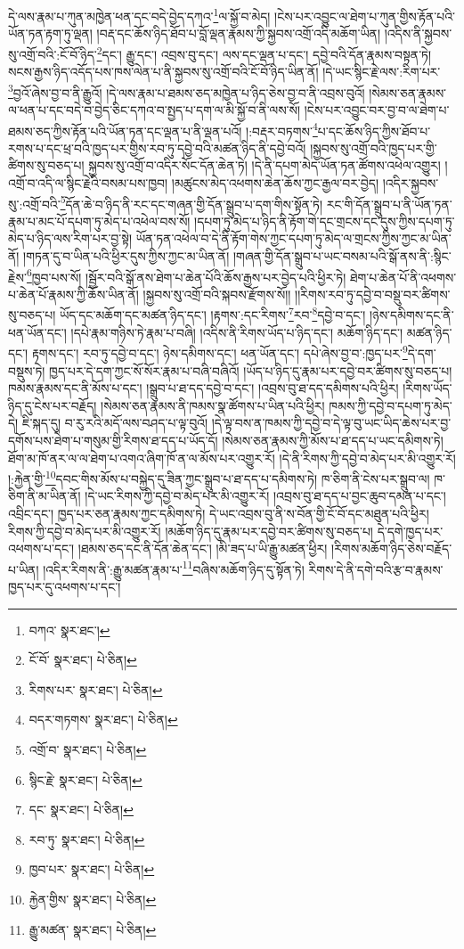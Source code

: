 དེ་ལས་རྣམ་པ་ཀུན་མཁྱེན་ཕན་དང་བདེ་བྱེད་དཀའ་\footnote{བཀའ་  སྣར་ཐང་། }ལ་སྐྱོ་བ་མེད། །ངེས་པར་འབྱུང་ལ་ཐེག་པ་ཀུན་གྱིས་རྟོན་པའི་ཡོན་ཏན་རྟག་ཏུ་ལྡན། །བརྡ་དང་ཆོས་ཉིད་ཐོབ་པ་བློ་ལྡན་རྣམས་ཀྱི་སྐྱབས་འགྲོ་འདི་མཆོག་ཡིན། །འདིས་ནི་སྐྱབས་སུ་འགྲོ་བའི་:ངོ་བོ་ཉིད་\footnote{ངོ་བོ་  སྣར་ཐང་།  པེ་ཅིན། }དང་། རྒྱུ་དང་། འབྲས་བུ་དང་། ལས་དང་ལྡན་པ་དང་། དབྱེ་བའི་དོན་རྣམས་བསྟན་ཏེ། སངས་རྒྱས་ཉིད་འདོད་པས་ཁས་ལེན་པ་ནི་སྐྱབས་སུ་འགྲོ་བའི་ངོ་བོ་ཉིད་ཡིན་ནོ། །དེ་ཡང་སྙིང་རྗེ་ལས་:རིག་པར་\footnote{རིགས་པར་  སྣར་ཐང་།  པེ་ཅིན། }བྱའོ་ཞེས་བྱ་བ་ནི་རྒྱུའོ། །དེ་ལས་རྣམ་པ་ཐམས་ཅད་མཁྱེན་པ་ཉིད་ཅེས་བྱ་བ་ནི་འབྲས་བུའོ། །སེམས་ཅན་རྣམས་ལ་ཕན་པ་དང་བདེ་བ་བྱེད་ཅིང་དཀའ་བ་སྤྱད་པ་དག་ལ་མི་སྐྱོ་བ་ནི་ལས་སོ། །ངེས་པར་འབྱུང་བར་བྱ་བ་ལ་ཐེག་པ་ཐམས་ཅད་ཀྱིས་རྟོན་པའི་ཡོན་ཏན་དང་ལྡན་པ་ནི་ལྡན་པའོ། །:བརྡར་བཏགས་\footnote{བདར་གཏགས་  སྣར་ཐང་།  པེ་ཅིན། }པ་དང་ཆོས་ཉིད་ཀྱིས་ཐོབ་པ་རགས་པ་དང་ཕྲ་བའི་ཁྱད་པར་གྱིས་རབ་ཏུ་དབྱེ་བའི་མཚན་ཉིད་ནི་དབྱེ་བའོ། །སྐྱབས་སུ་འགྲོ་བའི་ཁྱད་པར་གྱི་ཚིགས་སུ་བཅད་པ། སྐྱབས་སུ་འགྲོ་བ་འདིར་སོང་དོན་ཆེན་ཏེ། །དེ་ནི་དཔག་མེད་ཡོན་ཏན་ཚོགས་འཕེལ་འགྱུར། །འགྲོ་བ་འདི་ལ་སྙིང་རྗེའི་བསམ་པས་ཁྱབ། །མཚུངས་མེད་འཕགས་ཆེན་ཆོས་ཀྱང་རྒྱལ་བར་བྱེད། །འདིར་སྐྱབས་སུ་:འགྲོ་བའི་\footnote{འགྲོ་བ་  སྣར་ཐང་།  པེ་ཅིན། }དོན་ཆེ་བ་ཉིད་ནི་རང་དང་གཞན་གྱི་དོན་སྒྲུབ་པ་དག་གིས་སྟོན་ཏེ། རང་གི་དོན་སྒྲུབ་པ་ནི་ཡོན་ཏན་རྣམ་པ་མང་པོ་དཔག་ཏུ་མེད་པ་འཕེལ་བས་སོ། །དཔག་ཏུ་མེད་པ་ཉིད་ནི་རྟོག་གེ་དང་གྲངས་དང་དུས་ཀྱིས་དཔག་ཏུ་མེད་པ་ཉིད་ལས་རིག་པར་བྱ་སྟེ། ཡོན་ཏན་འཕེལ་བ་དེ་ནི་རྟོག་གེས་ཀྱང་དཔག་ཏུ་མེད་ལ་གྲངས་ཀྱིས་ཀྱང་མ་ཡིན་ནོ། །གཏན་དུ་བ་ཡིན་པའི་ཕྱིར་དུས་ཀྱིས་ཀྱང་མ་ཡིན་ནོ། །གཞན་གྱི་དོན་སྒྲུབ་པ་ཡང་བསམ་པའི་སྒོ་ནས་ནི་:སྙིང་རྗེས་\footnote{སྙིང་རྗེ་  སྣར་ཐང་།  པེ་ཅིན། }ཁྱབ་པས་སོ། །སྦྱོར་བའི་སྒོ་ནས་ཐེག་པ་ཆེན་པོའི་ཆོས་རྒྱས་པར་བྱེད་པའི་ཕྱིར་ཏེ། ཐེག་པ་ཆེན་པོ་ནི་འཕགས་པ་ཆེན་པོ་རྣམས་ཀྱི་ཆོས་ཡིན་ནོ། །སྐྱབས་སུ་འགྲོ་བའི་སྐབས་རྫོགས་སོ།། །།རིགས་རབ་ཏུ་དབྱེ་བ་བསྡུ་བར་ཚིགས་སུ་བཅད་པ། ཡོད་དང་མཆོག་དང་མཚན་ཉིད་དང་། །རྟགས་:དང་རིགས་\footnote{དང་  སྣར་ཐང་།  པེ་ཅིན། }རབ་\footnote{རབ་ཏུ་  སྣར་ཐང་།  པེ་ཅིན། }དབྱེ་བ་དང་། །ཉེས་དམིགས་དང་ནི་ཕན་ཡོན་དང་། །དཔེ་རྣམ་གཉིས་ཏེ་རྣམ་པ་བཞི། །འདིས་ནི་རིགས་ཡོད་པ་ཉིད་དང་། མཆོག་ཉིད་དང་། མཚན་ཉིད་དང་། རྟགས་དང་། རབ་ཏུ་དབྱེ་བ་དང་། ཉེས་དམིགས་དང་། ཕན་ཡོན་དང་། དཔེ་ཞེས་བྱ་བ་:ཁྱད་པར་\footnote{ཁྱབ་པར་  སྣར་ཐང་།  པེ་ཅིན། }དེ་དག་བསྡུས་ཏེ། ཁྱད་པར་དེ་དག་ཀྱང་སོ་སོར་རྣམ་པ་བཞི་བཞིའོ། །ཡོད་པ་ཉིད་དུ་རྣམ་པར་དབྱེ་བར་ཚིགས་སུ་བཅད་པ། ཁམས་རྣམས་དང་ནི་མོས་པ་དང་། །སྒྲུབ་པ་ཐ་དད་དབྱེ་བ་དང་། །འབྲས་བུ་ཐ་དད་དམིགས་པའི་ཕྱིར། །རིགས་ཡོད་ཉིད་དུ་ངེས་པར་བརྗོད། །སེམས་ཅན་རྣམས་ནི་ཁམས་སྣ་ཚོགས་པ་ཡིན་པའི་ཕྱིར། ཁམས་ཀྱི་དབྱེ་བ་དཔག་ཏུ་མེད་དེ། ཇི་སྐད་དུ། བ་རུ་རའི་མདོ་ལས་བཤད་པ་ལྟ་བུའོ། །དེ་ལྟ་བས་ན་ཁམས་ཀྱི་དབྱེ་བ་དེ་ལྟ་བུ་ཡང་ཡིད་ཆེས་པར་བྱ་དགོས་པས་ཐེག་པ་གསུམ་གྱི་རིགས་ཐ་དད་པ་ཡོད་དོ། །སེམས་ཅན་རྣམས་ཀྱི་མོས་པ་ཐ་དད་པ་ཡང་དམིགས་ཏེ། ཐོག་མ་ཁོ་ནར་ལ་ལ་ཐེག་པ་འགའ་ཞིག་ཁོ་ན་ལ་མོས་པར་འགྱུར་རོ། །དེ་ནི་རིགས་ཀྱི་དབྱེ་བ་མེད་པར་མི་འགྱུར་རོ། །:རྐྱེན་གྱི་\footnote{རྐྱེན་གྱིས་  སྣར་ཐང་།  པེ་ཅིན། }དབང་གིས་མོས་པ་བསྐྱེད་དུ་ཟིན་ཀྱང་སྒྲུབ་པ་ཐ་དད་པ་དམིགས་ཏེ། ཁ་ཅིག་ནི་ངེས་པར་སྒྲུབ་ལ། ཁ་ཅིག་ནི་མ་ཡིན་ནོ། །དེ་ཡང་རིགས་ཀྱི་དབྱེ་བ་མེད་པར་མི་འགྱུར་རོ། །འབྲས་བུ་ཐ་དད་པ་བྱང་ཆུབ་དམན་པ་དང་། འབྲིང་དང་། ཁྱད་པར་ཅན་རྣམས་ཀྱང་དམིགས་ཏེ། དེ་ཡང་འབྲས་བུ་ནི་ས་བོན་གྱི་ངོ་བོ་དང་མཐུན་པའི་ཕྱིར། རིགས་ཀྱི་དབྱེ་བ་མེད་པར་མི་འགྱུར་རོ། །མཆོག་ཉིད་དུ་རྣམ་པར་དབྱེ་བར་ཚིགས་སུ་བཅད་པ། དེ་དགེ་ཁྱད་པར་འཕགས་པ་དང་། །ཐམས་ཅད་དང་ནི་དོན་ཆེན་དང་། །མི་ཟད་པ་ཡི་རྒྱུ་མཚན་ཕྱིར། །རིགས་མཆོག་ཉིད་ཅེས་བརྗོད་པ་ཡིན། །འདིར་རིགས་ནི་:རྒྱུ་མཚན་རྣམ་པ་\footnote{རྒྱུ་མཚན་  སྣར་ཐང་།  པེ་ཅིན། }བཞིས་མཆོག་ཉིད་དུ་སྟོན་ཏེ། རིགས་དེ་ནི་དགེ་བའི་རྩ་བ་རྣམས་ཁྱད་པར་དུ་འཕགས་པ་དང་། 